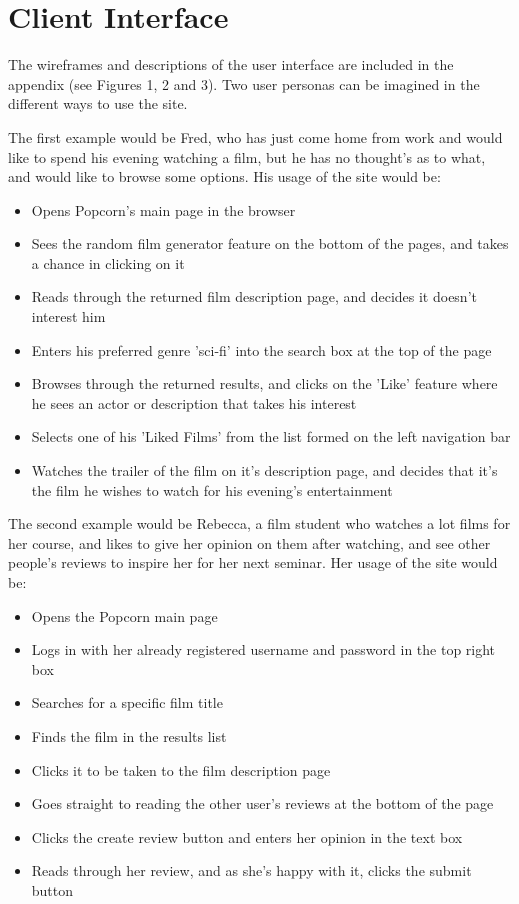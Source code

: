 \documentclass{sig-alt-release2}
\begin{document}
\section{Client Interface}
The wireframes and descriptions of the user interface are included in the appendix (see Figures 1, 2 and 3). Two user personas can be imagined in the different ways to use the site. 

The first example would be Fred, who has just come home from work and would like to spend his evening watching a film, but he has no thought's as to what, and would like to browse some options. His usage of the site would be:

\begin{itemize}
\item Opens Popcorn's main page in the browser
\item Sees the random film generator feature on the bottom of the pages, and takes a chance in clicking on it
\item Reads through the returned film description page, and decides it doesn't interest him
\item Enters his preferred genre 'sci-fi' into the search box at the top of the page
\item Browses through the returned results, and clicks on the 'Like' feature where he sees an actor or description that takes his interest
\item Selects one of his 'Liked Films' from the list formed on the left navigation bar
\item Watches the trailer of the film on it's description page, and decides that it's the film he wishes to watch for his evening's entertainment
\end{itemize}

The second example would be Rebecca, a film student who watches a lot films for her course, and likes to give her opinion on them after watching, and see other people's reviews to inspire her for her next seminar. Her usage of the site would be:

\begin{itemize}
\item Opens the Popcorn main page
\item Logs in with her already registered username and password in the top right box
\item Searches for a specific film title
\item Finds the film in the results list
\item Clicks it to be taken to the film description page
\item Goes straight to reading the other user's reviews at the bottom of the page
\item Clicks the create review button and enters her opinion in the text box
\item Reads through her review, and as she's happy with it, clicks the submit button 
\end{itemize}
 
\end{document}
